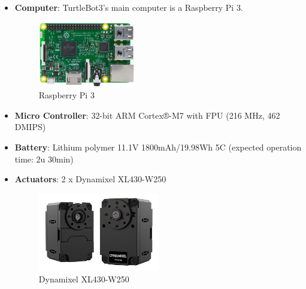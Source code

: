 \documentclass{article}
\begin{document}
\begin{itemize}
    \item \textbf{Computer}: TurtleBot3's main computer is a Raspberry Pi 3.
        \begin{figure}[h]
            \centering
            \includegraphics[width=0.4\textwidth]{hardware_pictures/RaspBerryPi 3.jpg}
            \caption{Raspberry Pi 3}
            \label{fig:RaspberryPi}
        \end{figure}
    \item \textbf{Micro Controller}: 32-bit ARM Cortex®-M7 with FPU (216 MHz, 462 DMIPS)
    \item \textbf{Battery}: Lithium polymer 11.1V 1800mAh/19.98Wh 5C (expected operation time: 2u 30min)
    \item \textbf{Actuators}: 2 x Dynamixel XL430-W250
        \begin{figure}[h]
            \centering
            \includegraphics[width=0.5\textwidth]{hardware_pictures/Dynamixel XL430-W250.png}
            \caption{Dynamixel XL430-W250}
            \label{fig:actuators}
        \end{figure}
        

\end{itemize}
\end{document}
